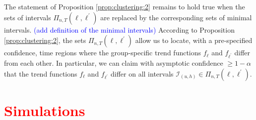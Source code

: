 \documentclass[a4paper,12pt]{article}
\begin{document}
The statement of Proposition \ref{prop:clustering:2} remains to hold true when the sets of intervals $\Pi_{n,T}(\ell,\ell^\prime)$ are replaced by the corresponding sets of minimal intervals. \textcolor{blue}{(add definition of the minimal intervals)}  According to Proposition \ref{prop:clustering:2}, the sets $\Pi_{n,T}(\ell,\ell^\prime)$ allow us to locate, with a pre-specified confidence, time regions where the group-specific trend functions $f_\ell$ and $f_{\ell^\prime}$ differ from each other. In particular, we can claim with asymptotic confidence $\ge 1 - \alpha$ that the trend functions $f_\ell$ and $f_{\ell^\prime}$ differ on all intervals $\mathcal{I}_{(u, h)} \in \Pi_{n,T}(\ell,\ell^\prime)$.

\section{\textcolor{red}{Simulations}}\label{sec:sim}
\end{document}
